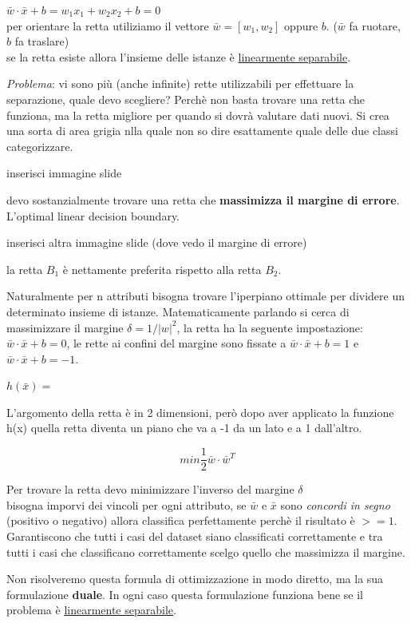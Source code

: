 \documentclass[12pt, a4paper,titlepage,openany]{article}
\begin{document}
$\bar{w} \cdot \bar{x} + b = w_1 x_1 + w_2 x_2 + b = 0$\\
per orientare la retta utiliziamo il vettore $\bar{w} = [w_1,w_2]$ oppure $b$. ($\bar{w}$ fa ruotare, $b$ fa traslare)\\
se la retta esiste allora l'insieme delle istanze è \underline{linearmente separabile}.

\textit{Problema}: vi sono pi\`u (anche infinite) rette utilizzabili per effettuare la separazione, quale devo scegliere? Perch\`e non basta trovare una retta che funziona, ma la retta migliore per quando si dovr\`a valutare dati nuovi. Si crea una sorta di area grigia nlla quale non so dire esattamente quale delle due classi categorizzare.

inserisci immagine slide 

devo sostanzialmente trovare una retta che \textbf{massimizza il margine di errore}. L'optimal linear decision boundary. 

inserisci altra immagine slide (dove vedo il margine di errore)

la retta $B_1$ è nettamente preferita rispetto alla retta $B_2$.

Naturalmente per n attributi bisogna trovare l'iperpiano ottimale per dividere un determinato insieme di istanze. Matematicamente parlando si cerca di massimizzare il margine $\delta = 1 / |w|^2$, la retta ha la seguente impostazione: $\bar{w} \cdot \bar{x} + b = 0$, le rette ai confini del margine sono fissate a $\bar{w} \cdot \bar{x} + b = 1$ e $\bar{w} \cdot \bar{x} + b = -1$. 

$h(\bar{x}) = $

L'argomento della retta \`e in 2 dimensioni, per\`o dopo aver applicato la funzione h(x) quella retta diventa un piano che va a -1 da un lato e a 1 dall'altro.

\[min \frac{1}{2}\bar{w} \cdot \bar{w}^T \]

Per trovare la retta devo minimizzare l'inverso del margine $\delta$\\
bisogna imporvi dei vincoli per ogni attributo, se $\bar{w}$ e $\bar{x}$ sono \textit{concordi in segno} (positivo o negativo) allora classifica perfettamente perch\`e il risultato è $>= 1$. Garantiscono che tutti i casi del dataset siano classificati correttamente e tra tutti i casi che classificano correttamente scelgo quello che massimizza il margine. 

Non risolveremo questa formula di ottimizzazione in modo diretto, ma la sua formulazione \textbf{duale}. In ogni caso questa formulazione funziona bene se il problema \`e \underline{linearmente separabile}.
\end{document}
